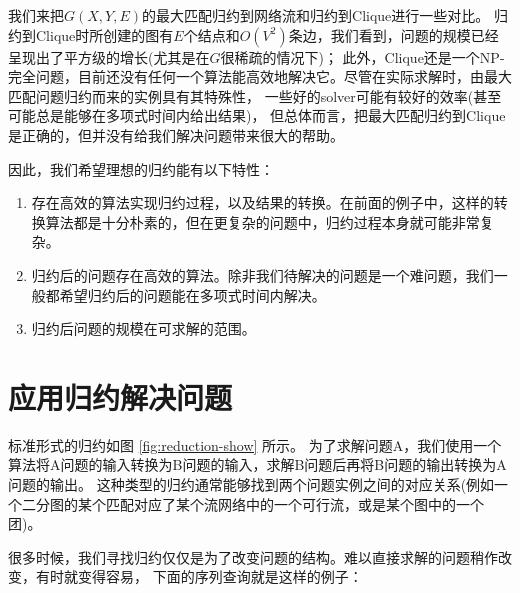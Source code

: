 

我们来把$G(X,Y,E)$的最大匹配归约到网络流和归约到Clique进行一些对比。
归约到Clique时所创建的图有$E$个结点和$O(V^2)$条边，我们看到，问题的规模已经呈现出了平方级的增长(尤其是在$G$很稀疏的情况下)；
此外，Clique还是一个NP-完全问题，目前还没有任何一个算法能高效地解决它。尽管在实际求解时，由最大匹配问题归约而来的实例具有其特殊性，
一些好的solver可能有较好的效率(甚至可能总是能够在多项式时间内给出结果)，
但总体而言，把最大匹配归约到Clique是正确的，但并没有给我们解决问题带来很大的帮助。

因此，我们希望理想的归约能有以下特性：

\begin{enumerate}
 \item 存在高效的算法实现归约过程，以及结果的转换。在前面的例子中，这样的转换算法都是十分朴素的，但在更复杂的问题中，归约过程本身就可能非常复杂。
 \item 归约后的问题存在高效的算法。除非我们待解决的问题是一个难问题，我们一般都希望归约后的问题能在多项式时间内解决。
 \item 归约后问题的规模在可求解的范围。
\end{enumerate}

\section{应用归约解决问题}

标准形式的归约如图 \ref{fig:reduction-show} 所示。
为了求解问题A，我们使用一个算法将A问题的输入转换为B问题的输入，求解B问题后再将B问题的输出转换为A问题的输出。
这种类型的归约通常能够找到两个问题实例之间的对应关系(例如一个二分图的某个匹配对应了某个流网络中的一个可行流，或是某个图中的一个团)。



很多时候，我们寻找归约仅仅是为了改变问题的结构。难以直接求解的问题稍作改变，有时就变得容易，
下面的序列查询就是这样的例子：

